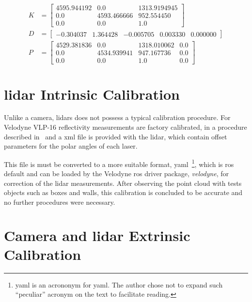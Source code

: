 \begin{subequations}
	\label{eq:camera-calibration-results}
	\begin{align}
		K & = 
		\begin{bmatrix}
			4595.944192 & 0.0         &  1313.9194945 \\
			0.0         & 4593.466666 &  952.554450 \\
			0.0         & 0.0         &  1.0
		\end{bmatrix} \\
		D & = 
		\begin{bmatrix}
			-0.304037 & 1.364428 &  -0.005705 & 0.003330 & 0.000000
		\end{bmatrix} \\
		P & = 
		\begin{bmatrix}
			4529.381836 & 0.0         & 1318.010062 & 0.0 \\
			0.0         & 4534.939941 & 947.167736  & 0.0 \\
			0.0         & 0.0         & 1.0         & 0.0 
		\end{bmatrix}
	\end{align}
\end{subequations}

	

\section{\ac{lidar} Intrinsic Calibration}
Unlike a camera, \acp{lidar} does not possess a typical calibration procedure. For Velodyne VLP-16 reflectivity measurements are factory calibrated, in a procedure described in~\cite{vlp16} and a \ac{xml} file is provided with the \ac{lidar}, which contain offset parameters for the polar angles of each laser.

This file is must be converted to a more suitable format, \acs{yaml}~\footnote{\acs{yaml} is an acrononym for \acl{yaml}. The author chose not to expand such  ``peculiar'' acronym on the text to facilitate reading.}, which is \ac{ros} default and can be loaded by the Velodyne \ac{ros} driver package, \emph{velodyne}, for correction of the \ac{lidar} measurements. After observing the point cloud with tests objects such as boxes and walls, this calibration is concluded to be accurate and no further procedures were necessary.

\section{Camera and \ac{lidar} Extrinsic Calibration}

